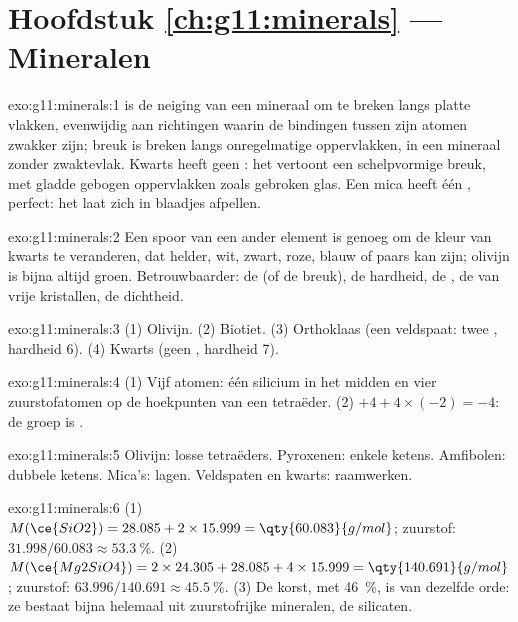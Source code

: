\section*{Hoofdstuk \ref{ch:g11:minerals} --- Mineralen}

\begin{solution}{exo:g11:minerals:1}
 is de neiging van een mineraal om te breken langs platte vlakken, evenwijdig aan
richtingen waarin de bindingen tussen zijn atomen zwakker zijn; breuk is
breken langs onregelmatige oppervlakken, in een mineraal zonder zwaktevlak.
Kwarts heeft geen : het vertoont een schelpvormige breuk, met gladde gebogen
oppervlakken zoals gebroken glas. Een mica heeft één , perfect: het laat zich
in blaadjes afpellen.
\end{solution}

\begin{solution}{exo:g11:minerals:2}
Een spoor van een ander element is genoeg om de kleur van kwarts te veranderen, dat
helder, wit, zwart, roze, blauw of paars kan zijn; olivijn is bijna altijd
groen. Betrouwbaarder: de  (of de breuk), de hardheid, de ,
de  van vrije kristallen, de dichtheid.
\end{solution}

\begin{solution}{exo:g11:minerals:3}
(1) Olivijn. (2) Biotiet. (3) Orthoklaas (een veldspaat: twee , hardheid
6). (4) Kwarts (geen , hardheid 7).
\end{solution}

\begin{solution}{exo:g11:minerals:4}
(1) Vijf atomen: één silicium in het midden en vier zuurstofatomen op de hoekpunten van
een tetraëder. (2) $+4 + 4 \times (-2) = -4$: de groep is .
\end{solution}

\begin{solution}{exo:g11:minerals:5}
Olivijn: losse tetraëders. Pyroxenen: enkele ketens. Amfibolen: dubbele
ketens. Mica's: lagen. Veldspaten en kwarts: raamwerken.
\end{solution}

\begin{solution}{exo:g11:minerals:6}
(1) $M(\ce{SiO2}) = 28.085 + 2 \times 15.999 = \qty{60.083}{g/mol}$;
zuurstof: $31.998/60.083 \approx \qty{53.3}{\percent}$.
(2) $M(\ce{Mg2SiO4}) = 2 \times 24.305 + 28.085 + 4 \times 15.999 =
\qty{140.691}{g/mol}$; zuurstof: $63.996/140.691 \approx \qty{45.5}{\percent}$.
(3) De korst, met \qty{46}{\percent}, is van dezelfde orde: ze bestaat bijna
helemaal uit zuurstofrijke mineralen, de silicaten.
\end{solution}

